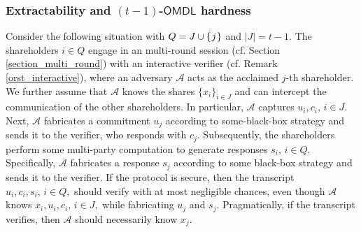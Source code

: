 \documentclass[10pt, psamsfonts, reqno]{amsart}
\theoremstyle{definition}
\theoremstyle{remark}
\numberwithin{equation}{section}
\begin{document}
\subsubsection{Extractability and $(t-1)$-$\mathsf{OMDL}$ hardness}\label{section_extractability_and_omdl}
Consider the following situation with
$Q = J \cup \{\hspace{0.5pt}j\hspace{0.5pt}\}$ and
$|J| = t-1$.
The shareholders $i \in Q$ engage
in an multi-round session
(cf. Section \ref{section_multi_round})
with an interactive verifier
(cf. Remark \ref{orst_interactive}),
where an adversary $\mathcal{A}$
acts as the acclaimed $j$-th shareholder.
We further assume that $\mathcal{A}$
knows the shares $\{x_i\}_{i \in J}$
and can intercept the communication
of the other shareholders.
In particular, $\mathcal{A}$ captures
$u_i, c_i,\hspace{2pt} i \in J$.
Next, $\mathcal{A}$ fabricates a commitment $u_j$
according to some-black-box strategy and sends it to the
verifier, who responds with $c_j$.
Subsequently, the shareholders
perform some multi-party computation
to generate responses $s_i,\hspace{2pt}i\in Q$.
Specifically, $\mathcal{A}$ fabricates a response $s_j$
according to some black-box strategy and sends it to the verifier.
If the protocol is secure, then the transcript
$u_i, c_i, s_i,\hspace{2pt} i \in Q,$
should verify with at most negligible chances,
even though $\mathcal{A}$ knows
$x_i, u_i, c_i,\hspace{2pt} i \in J,$
while fabricating $u_j$ and $s_j$.
Pragmatically, if the transcript verifies,
then $\mathcal{A}$ should necessarily know $x_j$.
\end{document}
